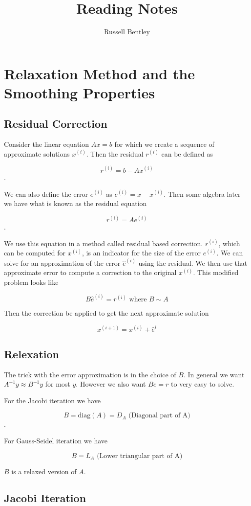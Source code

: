 \documentclass{report}
\title{Reading Notes}
\author{Russell Bentley}
\begin{document}
\tableofcontents

\chapter{Relaxation Method and the Smoothing Properties}

\section{Residual Correction}

Consider the linear equation $Ax = b$ for which we create a sequence of
approximate solutions $x^{(i)}$.
Then the residual $r^{(i)}$ can be defined as

$$r^{(i)} = b - Ax^{(i)}$$.

We can also define the error $e^{(i)}$ as $e^{(i)} = x - x^{(i)}$.
Then some algebra later we have what is known as the residual equation

$$r^{(i)} = Ae^{(i)}$$.

We use this equation in a method called residual based correction.
$r^{(i)}$, which can be computed for $x^{(i)}$, is an
indicator for the size of the error $e^{(i)}$.
We can solve for an approximation of the error $\hat{e}^{(i)}$ using the residual.
We then use that approximate error to compute a correction to the original $x^{(i)}$.
This modified problem looks like


$$B\hat{e}^{(i)} = r^{(i)} \text{ where } B \sim A$$

Then the correction be applied to get the next approximate solution

$$x^{(i+1)} = x^{(i)} + \hat{e}^{i}$$

\section{Relexation}

The trick with the error approximation is in the choice of $B$.
In general we want $A^{-1}y \approx B^{-1}y$ for most $y$.
However we also want $Be = r$ to very easy to solve.

For the Jacobi iteration we have

$$B = \text{diag}(A) = D_A \text{ (Diagonal part of A)}$$.

For Gauss-Seidel iteration we have

$$B = L_A \text{ (Lower triangular part of A)}$$

$B$ is a relaxed version of $A$.

\section{Jacobi Iteration}
\end{document}
